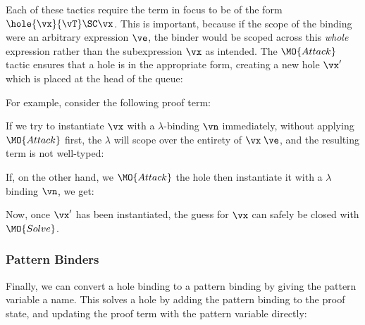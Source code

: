 Each of these tactics require the term in focus to be of the form $\hole{\vx}{\vT}\SC\vx$.
This is important, because if the scope of the binding were an arbitrary expression $\ve$,
the binder would be scoped across this \emph{whole} expression rather than the subexpression
$\vx$ as intended.
The $\MO{Attack}$ tactic ensures that a hole
is in the appropriate form, creating a new hole $\vx'$ which is placed at the
head of the queue:


\noindent
For example, consider the following proof term:

\DM{
\hole{\vx}{\va\to\vb}\SC\vx\;\ve
}

\noindent
If we try to instantiate $\vx$ with a $\lambda$-binding $\vn$ immediately,
without applying $\MO{Attack}$ first, the $\lambda$ will scope over the
entirety of $\vx\;\ve$, and the resulting term is not well-typed:

\DM{
\AR{
\lam{\vn}{\va}\SC\hole{\vx}{\vb}\SC\vx\;\ve
}
}

\noindent
If, on the other hand, we $\MO{Attack}$ the hole then instantiate it with
a $\lambda$ binding $\vn$, we get:


\noindent
Now, once $\vx'$ has been instantiated, the guess for $\vx$ can safely be
closed with $\MO{Solve}$.

\subsubsection{Pattern Binders}

Finally, we can convert a hole binding to a pattern binding by giving the 
pattern variable a name. This solves a hole
by adding the pattern binding to the proof state, and updating the proof term
with the pattern variable directly:


